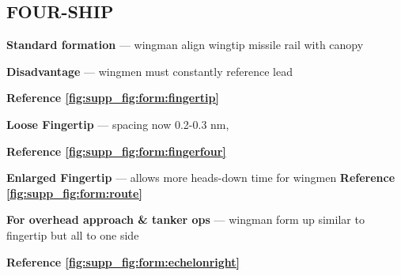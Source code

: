 \subsection{FOUR-SHIP}

\begin{tcoloritemize}
    \blueitem[Fingertip]
    \textbf{Standard formation}
    --- wingman align wingtip missile rail with canopy
    
    \textbf{Disadvantage} --- wingmen must constantly reference lead

    \hfill\textbf{Reference \cref{fig:supp_fig:form:fingertip}}

    \textbf{Loose Fingertip} --- spacing now 0.2-0.3 nm,

    \hfill\textbf{Reference \cref{fig:supp_fig:form:fingerfour}}

    \blueitem[Route]
    \textbf{Enlarged Fingertip}
    --- allows more heads-down time for wingmen
    \hfill\textbf{Reference \cref{fig:supp_fig:form:route}}

    \textbf{For overhead approach \& tanker ops}
    --- wingman form up similar to fingertip but all to one side

    \hfill\textbf{Reference \cref{fig:supp_fig:form:echelonright}}
\end{tcoloritemize}

